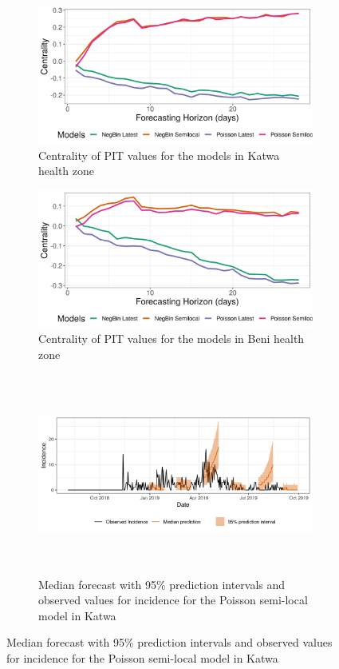 \documentclass[12pt]{article}
\begin{document}
\begin{figure}[h!]
\begin{subfigure}{0.5\textwidth}
  \centering
  \includegraphics[width=\linewidth, ]{../output/Katwa_centrality.png}  
  \caption{Centrality of PIT values for the models in Katwa health zone }
  \label{fig:beni_katwa_1}
\end{subfigure}
\begin{subfigure}{0.5\textwidth}
  \centering
  \includegraphics[width=\linewidth]{../output/Beni_centrality.png}  
  \caption{Centrality of PIT values for the models in Beni health zone}
  \label{fig:beni_katwa_2}
\end{subfigure}

\begin{subfigure}{\textwidth}
  \centering
  \includegraphics[width=0.9\linewidth, height=6.6cm]{../output/Katwa_predictions.png}  
  \caption{ Median forecast with 95\% prediction intervals and observed values for incidence for the Poisson semi-local model in Katwa}
  \label{fig:beni_katwa_3}
\end{subfigure}


\end{figure}
\end{document}
